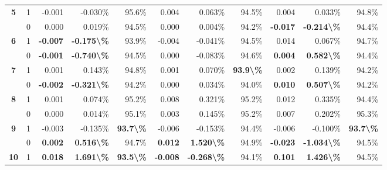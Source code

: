 \begin{table}
\begin{tabular}[t]{>{}ccrrrrrrrrr}
\multirow[t]{-2}{*}{\centering\arraybackslash \textbf{5}} & 1 & -0.001 & -0.030\% & 95.6\% & 0.004 & 0.063\% & 94.5\% & 0.004 & 0.033\% & 94.8\%\\

 & 0 & 0.000 & 0.019\% & 94.5\% & 0.000 & 0.004\% & 94.2\% & \textbf{-0.017} & \textbf{-0.214\textbackslash{}\%} & 94.4\%\\

\multirow[t]{-2}{*}{\centering\arraybackslash \textbf{6}} & 1 & \textbf{-0.007} & \textbf{-0.175\textbackslash{}\%} & 93.9\% & -0.004 & -0.041\% & 94.5\% & 0.014 & 0.067\% & 94.7\%\\

\rule{0pt}{4ex}
 & 0 & \textbf{-0.001} & \textbf{-0.740\textbackslash{}\%} & 94.5\% & 0.000 & -0.083\% & 94.6\% & \textbf{ 0.004} & \textbf{ 0.582\textbackslash{}\%} & 94.4\%\\

\multirow[t]{-2}{*}{\centering\arraybackslash \textbf{7}} & 1 & 0.001 & 0.143\% & 94.8\% & 0.001 & 0.070\% & \textbf{93.9\textbackslash{}\%} & 0.002 & 0.139\% & 94.2\%\\

 & 0 & \textbf{-0.002} & \textbf{-0.321\textbackslash{}\%} & 94.2\% & 0.000 & 0.034\% & 94.0\% & \textbf{ 0.010} & \textbf{ 0.507\textbackslash{}\%} & 94.2\%\\

\multirow[t]{-2}{*}{\centering\arraybackslash \textbf{8}} & 1 & 0.001 & 0.074\% & 95.2\% & 0.008 & 0.321\% & 95.2\% & 0.012 & 0.335\% & 94.4\%\\

 & 0 & 0.000 & 0.014\% & 95.1\% & 0.003 & 0.145\% & 95.2\% & 0.007 & 0.202\% & 95.3\%\\

\multirow[t]{-2}{*}{\centering\arraybackslash \textbf{9}} & 1 & -0.003 & -0.135\% & \textbf{93.7\textbackslash{}\%} & -0.006 & -0.153\% & 94.4\% & -0.006 & -0.100\% & \textbf{93.7\textbackslash{}\%}\\

\rule{0pt}{4ex}
 & 0 & \textbf{ 0.002} & \textbf{ 0.516\textbackslash{}\%} & 94.7\% & \textbf{ 0.012} & \textbf{ 1.520\textbackslash{}\%} & 94.9\% & \textbf{-0.023} & \textbf{-1.034\textbackslash{}\%} & 94.5\%\\

\multirow[t]{-2}{*}{\centering\arraybackslash \textbf{10}} & 1 & \textbf{ 0.018} & \textbf{ 1.691\textbackslash{}\%} & \textbf{93.5\textbackslash{}\%} & \textbf{-0.008} & \textbf{-0.268\textbackslash{}\%} & 94.1\% & \textbf{ 0.101} & \textbf{ 1.426\textbackslash{}\%} & 94.5\%\\
\bottomrule
\end{tabular}
\end{table}
